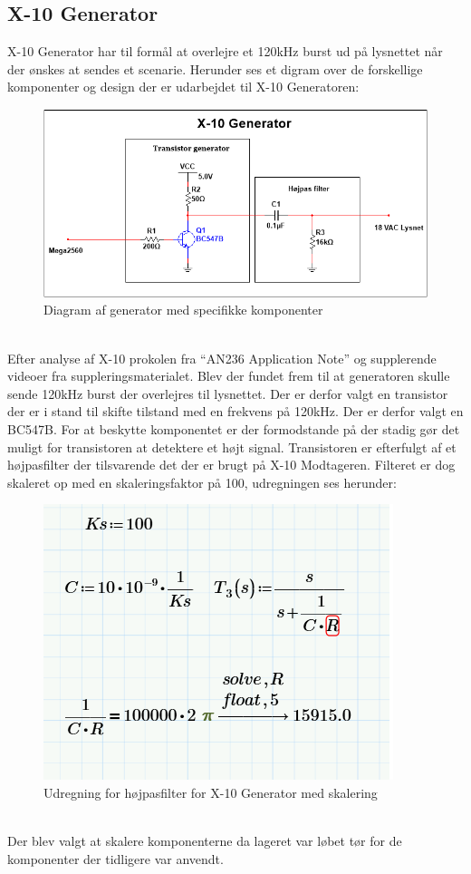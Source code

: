 \documentclass[11pt]{article}
\begin{document}
\subsection{X-10 Generator}
X-10 Generator har til formål at overlejre et 120kHz burst ud på lysnettet når der ønskes at sendes et scenarie. Herunder ses et digram over de forskellige komponenter og design der er udarbejdet til X-10 Generatoren:
\begin{figure}[!h]
\centering
\includegraphics[scale = 0.9]{X10-generator-ms}
\caption{Diagram af generator med specifikke komponenter}
\end{figure}\\
Efter analyse af X-10 prokolen fra ``AN236 Application Note'' og supplerende videoer fra suppleringsmaterialet. Blev der fundet frem til at generatoren skulle sende 120kHz burst der overlejres til lysnettet. Der er derfor valgt en transistor der er i stand til skifte tilstand med en frekvens på 120kHz. Der er derfor valgt en BC547B. For at beskytte komponentet er der formodstande på der stadig gør det muligt for transistoren at detektere et højt signal. Transistoren er efterfulgt af et højpasfilter der tilsvarende det der er brugt på X-10 Modtageren. Filteret er dog skaleret op med en skaleringsfaktor på 100, udregningen ses herunder:
\begin{figure}[!h]
\centering
\includegraphics[scale = 0.5]{udregningHPgenerator}
\caption{Udregning for højpasfilter for X-10 Generator med skalering}
\end{figure}\\
Der blev valgt at skalere komponenterne da lageret var løbet tør for de komponenter der tidligere var anvendt.
\end{document}
